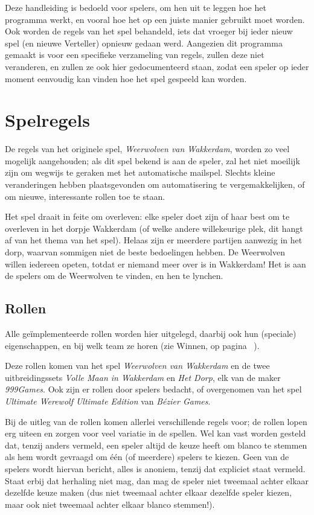 \documentclass[12pt]{article}
\begin{document}
    Deze handleiding is bedoeld voor spelers, om hen uit te leggen hoe het programma werkt, en vooral hoe het op een juiste manier gebruikt moet worden. Ook worden de regels van het spel behandeld, iets dat vroeger bij ieder nieuw spel (en nieuwe Verteller) opnieuw gedaan werd. Aangezien dit programma gemaakt is voor een specifieke verzameling van regels, zullen deze niet veranderen, en zullen ze ook hier gedocumenteerd staan, zodat een speler op ieder moment eenvoudig kan vinden hoe het spel gespeeld kan worden.

\section{Spelregels}

  De regels van het originele spel, \emph{Weerwolven van Wakkerdam}, worden zo veel mogelijk aangehouden; als dit spel bekend is aan de speler, zal het niet moeilijk zijn om wegwijs te geraken met het automatische mailspel. Slechts kleine veranderingen hebben plaatsgevonden om automatisering te vergemakkelijken, of om nieuwe, interessante rollen toe te staan.

  Het spel draait in feite om overleven: elke speler doet zijn of haar best om te overleven in het dorpje Wakkerdam (of welke andere willekeurige plek, dit hangt af van het thema van het spel). Helaas zijn er meerdere partijen aanwezig in het dorp, waarvan sommigen niet de beste bedoelingen hebben. De Weerwolven willen iedereen opeten, totdat er niemand meer over is in Wakkerdam! Het is aan de spelers om de Weerwolven te vinden, en hen te lynchen.

  \subsection{Rollen} \label{subsec:rollen}

    Alle ge\"implementeerde rollen worden hier uitgelegd, daarbij ook hun (speciale) eigenschappen, en bij welk team ze horen (zie Winnen, op pagina~\pageref{subsec:winnen} ).
  
    Deze rollen komen van het spel \emph{Weerwolven van Wakkerdam} en de twee uitbreidingssets \emph{Volle Maan in Wakkerdam} en \emph{Het Dorp}, elk van de maker \emph{999Games}. Ook zijn er rollen door spelers bedacht, of overgenomen van het spel \emph{Ultimate Werewolf Ultimate Edition} van \emph{B\'ezier Games}. 
  
    Bij de uitleg van de rollen komen allerlei verschillende regels voor; de rollen lopen erg uiteen en zorgen voor veel variatie in de spellen. Wel kan vast worden gesteld dat, tenzij anders vermeld, een speler altijd de keuze heeft om blanco te stemmen als hem wordt gevraagd om \'e\'en (of meerdere) spelers te kiezen. Geen van de spelers wordt hiervan bericht, alles is anoniem, tenzij dat expliciet staat vermeld. Staat erbij dat herhaling niet mag, dan mag de speler niet tweemaal achter elkaar dezelfde keuze maken (dus niet tweemaal achter elkaar dezelfde speler kiezen, maar ook niet tweemaal achter elkaar blanco stemmen!).
  
\end{document}
